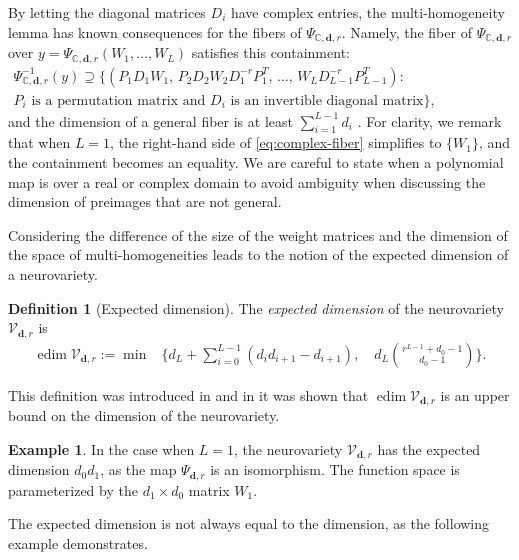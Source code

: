 \documentclass[12pt]{article}
\theoremstyle{definition}
\newtheorem{definition}[theorem]{Definition}
\newtheorem{example}[theorem]{Example}
\newcommand{\edimLHS}{d_L+\sum_{i=0}^{L-1}(d_id_{i+1}-d_{i+1})}
\newcommand{\edimRHS}{d_L\binom{r^{L-1}+d_0-1}{d_0-1}}
\newcommand{\demph}[1]{\emph{{\color{RoyalBlue}#1}}}
\newcommand{\complexPsiMap}{\Psi_{{\mathbb{C},\mathbf{d},r}}}
\newcommand{\edim}[1]{\operatorname{edim}{#1}}
\begin{document}
By letting the diagonal matrices $D_i$ have complex entries, 
the multi-homogeneity lemma has known consequences for the fibers of $\complexPsiMap$.
Namely, the fiber of
$\complexPsiMap$
over  $y=\complexPsiMap(W_1,\dots,W_L)$ satisfies this containment:
\begin{equation}\label{eq:complex-fiber}
\begin{split}
    \complexPsiMap^{-1}(y)\supseteq
    \Big\{
(P_1D_1W_1,\,
P_2D_2W_2D_1^{-r}P_1^T,\,
\dots, \,
W_L D_{L-1}^{-r} P_{L-1}^T) 
:
\,\phantom{xxxxxxxxxxxx}&\\
P_i \text{ is a permutation matrix and }D_i\text{ is an invertible diagonal matrix}
\Big\},
\end{split}
\end{equation}
and the dimension of a general fiber is at least $\sum_{i=1}^{L-1}d_i$ \cite[Lemma 13]{KTB2019}. For clarity, we remark that when $L=1$, the right-hand side of  \eqref{eq:complex-fiber}  simplifies to $\{W_1\}$, and 
the containment becomes an equality.
We are careful to state when a polynomial map is over a  real or complex domain to avoid ambiguity when discussing the dimension of preimages that are not general.

\medskip
Considering the difference of the size of the weight matrices and the dimension of the space of multi-homogeneities leads to the notion of the expected dimension of a neurovariety. 


\begin{definition}[Expected dimension]\label{def:expected-dim}
The \demph{expected dimension} of the neurovariety $\mathcal{V}_{\mathbf{d},r}$ is
\begin{align}\label{eq:edim-numbers}
    \edim{\mathcal{V}_{\mathbf{d},r}}:=\min&\Bigg\{\edimLHS, \quad \edimRHS\Bigg\}.
\end{align}
\end{definition}

This definition was introduced in \cite{KLW2024} and in \cite{KTB2019}
it was shown that $\edim{\mathcal{V}_{\mathbf{d},r}}$ is an upper bound on the dimension of the neurovariety.
\begin{example}\label{ex:L-equals-one}
In the case when $L=1$, the neurovariety $\mathcal{V}_{\mathbf{d},r}$ has the expected dimension $d_0d_1$, as the map $\Psi_{\mathbf{d},r}$ is an isomorphism. 
The function space is parameterized by the $d_1\times d_0$ matrix $W_1$.
\end{example}

The expected dimension is not always equal to the dimension, as the following example demonstrates.
\end{document}
